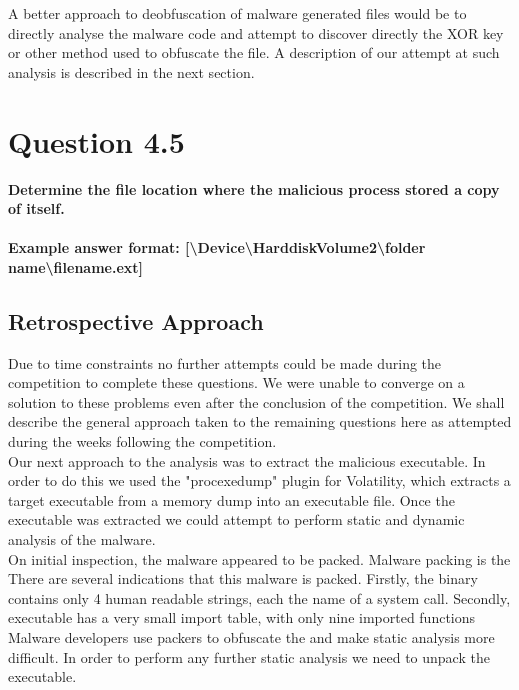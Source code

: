 A better approach to deobfuscation of malware generated files would be to directly analyse the malware code and attempt to discover directly the XOR key or other method used to obfuscate the file. A description of our attempt at such analysis is described in the next section.\\



\section{Question 4.5}
\textbf{Determine the file location where the malicious process stored a copy of
itself.
\\\\
Example answer format:
[\textbackslash{}Device\textbackslash{}HarddiskVolume2\textbackslash{}folder
name\textbackslash{}filename.ext]}
\subsection{Retrospective Approach}
Due to time constraints no further attempts could be made during the competition to complete these questions. We were unable to converge on a solution to these problems even after the conclusion of the competition. We shall describe the general approach taken to the remaining questions here as attempted during the weeks following the competition.\\

Our next approach to the analysis was to extract the malicious executable. In order to do this we used the "procexedump" plugin for Volatility, which extracts a target executable from a memory dump into an executable file. Once the executable was extracted we could attempt to perform static and dynamic analysis of the malware.\\

On initial inspection, the malware appeared to be packed. Malware packing is the There are several indications that this malware is packed. Firstly, the binary contains only 4 human readable strings, each the name of a system call. Secondly, executable has a very small import table, with only nine imported functions \cite[13]{pracmal} 
Malware developers use packers to obfuscate the and make static analysis more difficult. In order to perform any further static analysis we need to unpack the executable.\\

